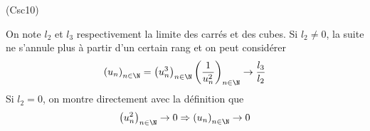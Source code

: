 \begin{tiny}(Csc10)\end{tiny} On note $l_2$ et $l_3$ respectivement la limite des carrés et des cubes. Si $l_2\neq0$, la suite ne s'annule plus à partir d'un certain rang et on peut considérer
\begin{displaymath}
  \left( u_n\right)_{n\in \N} = \left( u_n^3\right)_{n\in \N} \left( \frac{1}{u_n^2}\right)_{n\in \N} \rightarrow \frac{l_3}{l_2}
\end{displaymath}
Si $l_2=0$, on montre directement avec la définition que 
\begin{displaymath}
  \left( u_n^2\right)_{n\in \N}\rightarrow 0 \Rightarrow \left( u_n\right)_{n\in \N} \rightarrow 0
\end{displaymath}
